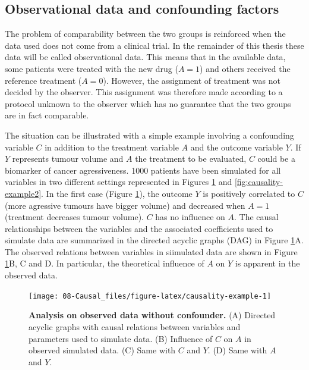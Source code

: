 \documentclass[a4paper,12pt,twoside,onecolumn,openright,final,oldfontcommands]{memoir}
\begin{document}
\subsection{Observational data and confounding
factors}\label{observational-data-and-confounding-factors}

The problem of comparability between the two groups is reinforced when
the data used does not come from a clinical trial. In the remainder of
this thesis these data will be called observational data. This means
that in the available data, some patients were treated with the new drug
(\(A=1\)) and others received the reference treatment (\(A=0\)).
However, the assignment of treatment was not decided by the observer.
This assignment was therefore made according to a protocol unknown to
the observer which has no guarantee that the two groups are in fact
comparable.

The situation can be illustrated with a simple example involving a
confounding variable \(C\) in addition to the treatment variable \(A\)
and the outcome variable \(Y\). If \(Y\) represents tumour volume and
\(A\) the treatment to be evaluated, \(C\) could be a biomarker of
cancer agressiveness. 1000 patients have been simulated for all
variables in two different settings represented in Figures
\ref{fig:causality-example} and \ref{fig:causality-example2}. In the
first case (Figure \ref{fig:causality-example}), the outcome \(Y\) is
positively correlated to \(C\) (more agressive tumours have bigger
volume) and decreased when \(A=1\) (treatment decreases tumour volume).
\(C\) has no influence on \(A\). The causal relationships between the
variables and the associated coefficients used to simulate data are
summarized in the directed acyclic graphs (DAG) in Figure
\ref{fig:causality-example}A. The observed relations between variables
in siimulated data are shown in Figure \ref{fig:causality-example}B, C
and D. In particular, the theoretical influence of \(A\) on \(Y\) is
apparent in the observed data.

\begin{figure}

{\centering \texttt{[image: 08-Causal\_files/figure-latex/causality-example-1]} 

}

\caption[Analysis on observed data without confounder]{\textbf{Analysis on observed data
without confounder.} (A) Directed acyclic graphs with causal relations
between variables and parameters used to simulate data. (B) Influence of
\(C\) on \(A\) in observed simulated data. (C) Same with \(C\) and
\(Y\). (D) Same with \(A\) and \(Y\).}\label{fig:causality-example}
\end{figure}
\end{document}
